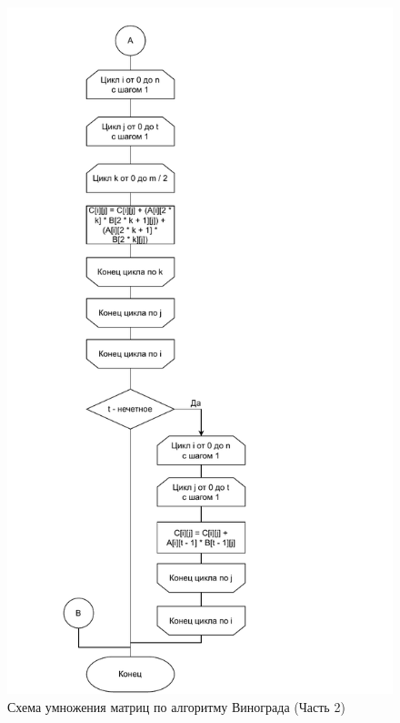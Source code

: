 \begin{figure}[h]
	\centering
	\includegraphics[width=0.8\linewidth]{img/vinograd_alg_2.pdf}
	\caption{Схема умножения матриц по алгоритму Винограда (Часть 2)}
	\label{img:vinograd_alg_2}
\end{figure}

